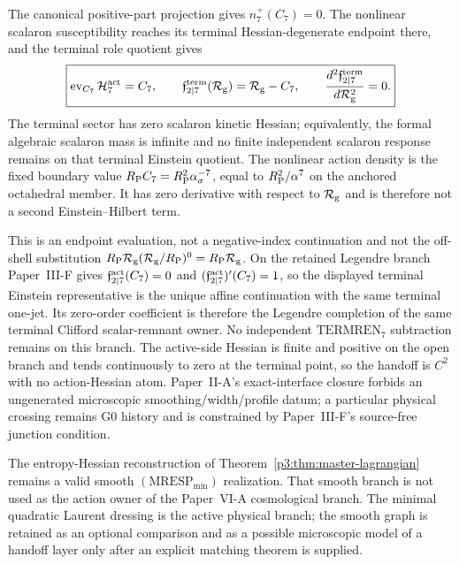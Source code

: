 \documentclass[12pt,a4paper]{article}
\begin{document}
\begin{theorem}
\label{p3e:thm:laur17-projected-terminal-freeze}
\label{p3e:thm:laur17-terminal-scalaron-decoupling}
The canonical positive-part projection gives \(n_7^+(C_7)=0\).  The nonlinear scalaron susceptibility reaches its terminal Hessian-degenerate
endpoint there, and the terminal role quotient gives
\begin{equation}
\label{p3e:eq:laur17-postfreeze-raw}
 \boxed{
 \operatorname{ev}_{C_7}\mathcal H_7^{\rm act}=C_7,
 \qquad
 \mathfrak f_{2\mid7}^{\rm term}(\mathcal R_{\rm g})=\mathcal R_{\rm g}-C_7,
 \qquad
 \frac{d^2\mathfrak f_{2\mid7}^{\rm term}}{d\mathcal R_{\rm g}^2}=0.}
\end{equation}
The terminal sector has zero scalaron kinetic Hessian; equivalently, the formal
algebraic scalaron mass is infinite and no finite independent scalaron response
remains on that terminal Einstein quotient.  The
nonlinear action density is the fixed boundary value
\(R_{\mathrm P} C_7=R_{\mathrm P}^2\alpha_\sigma^{-7}\), equal to
\(R_{\mathrm P}^2/\alpha^7\) on the anchored octahedral member.  It has zero derivative with respect
to \(\mathcal R_{\rm g}\) and is therefore not a second Einstein--Hilbert term.

This is an endpoint evaluation, not a negative-index continuation and not the
off-shell substitution
\(R_{\mathrm P}\mathcal R_{\rm g}(\mathcal R_{\rm g}/R_{\mathrm P})^0=R_{\mathrm P}\mathcal R_{\rm g}\).  On the retained
Legendre branch Paper~III-F gives
\(\mathfrak f_{2\mid7}^{\rm act}(C_7)=0\) and
\((\mathfrak f_{2\mid7}^{\rm act})'(C_7)=1\), so the displayed terminal
Einstein representative is the unique affine continuation with the same
terminal one-jet.  Its zero-order coefficient is therefore the Legendre completion of the
same terminal Clifford scalar-remnant owner.  No independent
\(\mathrm{TERMREN}_7\) subtraction remains on this branch.  The active-side
Hessian is finite and positive on the open branch and tends continuously to zero at the terminal point, so the handoff is \(C^2\) with no action-Hessian atom.
Paper~II-A's exact-interface closure forbids an ungenerated microscopic
smoothing/width/profile datum; a particular physical crossing remains G0
history and is constrained by Paper~III-F's source-free junction condition.
\end{theorem}

\begin{remark}
\label{p3e:rem:laur17-versus-smooth-mresp}
The entropy-Hessian reconstruction of
Theorem~\ref{p3:thm:master-lagrangian} remains a valid smooth
\((\mathrm{MRESP}_{\min})\) realization.  That smooth branch is not used
as the action owner of the Paper~VI-A cosmological branch.  The
minimal quadratic Laurent dressing is the active physical branch; the smooth
graph is retained as an optional comparison and as a possible microscopic
model of a handoff layer only after an explicit matching theorem is supplied.
\end{remark}
\end{document}

